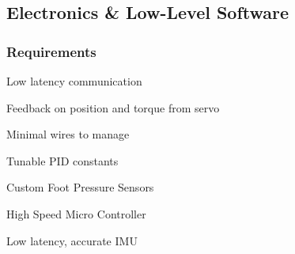         



    \subsection{Electronics \& Low-Level Software}
        \subsubsection{Requirements}
            \begin{Deliverables} %
                \item Low latency communication
                \item Feedback on position and torque from servo
                \item Minimal wires to manage
                \item Tunable PID constants
                \item Custom Foot Pressure Sensors
                \item High Speed Micro Controller
                \item Low latency, accurate IMU
            \end{Deliverables}

